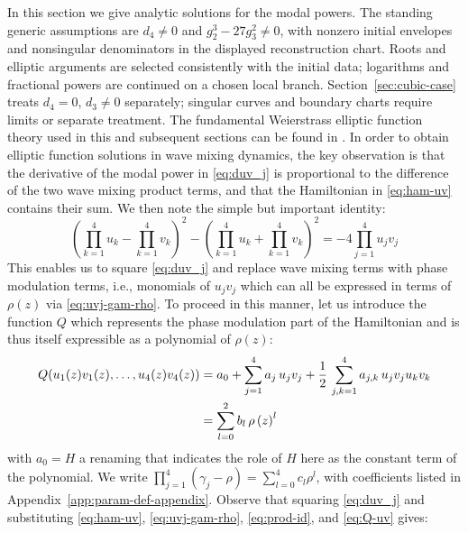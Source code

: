 \documentclass[11pt,a4paper]{article}
\numberwithin{equation}{section}
\begin{document}
In this section we give analytic solutions for the modal powers.
The standing generic assumptions are $d_4\ne0$ and $g_2^3-27g_3^2\ne0$, with nonzero initial envelopes and nonsingular denominators in the displayed reconstruction chart.
Roots and elliptic arguments are selected consistently with the initial data; logarithms and fractional powers are continued on a chosen local branch.
Section~\ref{sec:cubic-case} treats $d_4=0$, $d_3\ne0$ separately; singular curves and boundary charts require limits or separate treatment.
The fundamental Weierstrass elliptic function theory used in this and subsequent sections can be found in \cite{whittakerCourseModernAnalysis2021}.
In order to obtain elliptic function solutions in wave mixing dynamics, the key observation is that the derivative of the modal power in \eqref{eq:duv_j} is proportional to the difference of the two wave mixing product terms, and that the Hamiltonian in \eqref{eq:ham-uv} contains their sum.
We then note the simple but important identity:
\begin{equation}
\label{eq:prod-id}
\left(\prod\limits_{k=1}^{4} u_k - \prod\limits_{k=1}^{4} v_k\right)^2 - \left(\prod\limits_{k=1}^{4} u_k + \prod\limits_{k=1}^{4} v_k\right)^2 = - 4 \prod\limits_{j=1}^{4} u_j v_j
\end{equation}
This enables us to square \eqref{eq:duv_j} and replace wave mixing terms with phase modulation terms, i.e., monomials of $u_j v_j$ which can all be expressed in terms of $\rho(z)$ via \eqref{eq:uvj-gam-rho}.
To proceed in this manner, let us introduce the function $Q$ which represents the phase modulation part of the Hamiltonian and is thus itself expressible as a polynomial of $\rho(z)$:
\begin{align}
Q(u_1(z)v_1(z), \dots, u_4(z)v_4(z)) &= a_0 + \sum_{j=1}^{4} a_{j}\, u_j v_j + \frac{1}{2}\,\sum_{j,k=1}^{4} a_{j,k}\, u_j v_j u_k v_k  \notag  \\
& = \sum_{l=0}^{2}b_l\,\rho\left(z\right)^l \label{eq:Q-uv}
\end{align}
with $a_0=H$ a renaming that indicates the role of $H$ here as the constant term of the polynomial.
We write $\prod_{j=1}^4(\gamma_j-\rho)=\sum_{l=0}^4 c_l\rho^l$, with coefficients listed in Appendix~\ref{app:param-def-appendix}.
Observe that squaring \eqref{eq:duv_j} and substituting \eqref{eq:ham-uv}, \eqref{eq:uvj-gam-rho}, \eqref{eq:prod-id}, and \eqref{eq:Q-uv} gives:
\end{document}
